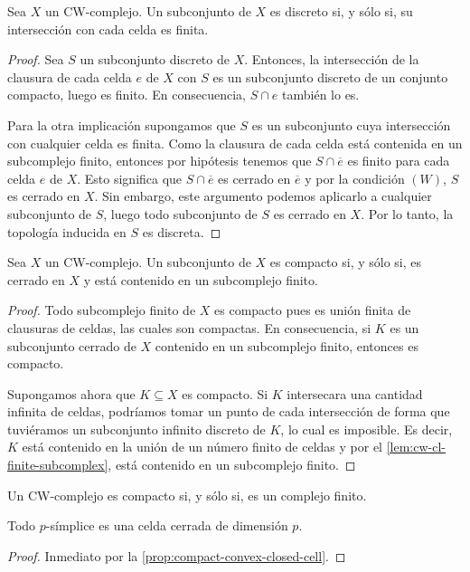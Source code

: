 \begin{lema}
	Sea \(X\) un CW-complejo. Un subconjunto de \(X\) es discreto si, y sólo si, su intersección con cada 
	celda es finita.
\end{lema}
\begin{proof}
	Sea \(S\) un subconjunto discreto de \(X\). Entonces, la intersección de la clausura de cada 
	celda \(e\) de \(X\) con \(S\) es un subconjunto discreto de un conjunto compacto, luego es finito. 
	En consecuencia, \(S \cap e\) también lo es.
	
	Para la otra implicación supongamos que \(S\) es un subconjunto cuya intersección con 
	cualquier celda es finita. Como la clausura de cada celda está contenida en un 
	subcomplejo finito, entonces por hipótesis tenemos que \(S \cap \overline{e}\) es finito 
	para cada celda \(e\) de \(X\). Esto significa que \(S \cap \overline{e}\) es cerrado en 
	\(\overline{e}\) y por la condición \((W)\), \(S\) es cerrado en \(X\). Sin embargo, este argumento 
	podemos aplicarlo a cualquier subconjunto de \(S\), luego todo subconjunto de \(S\) es cerrado en 
	\(X\). Por lo tanto, la topología inducida en \(S\) es discreta. 
\end{proof}

\begin{teorema}
	Sea \(X\) un CW-complejo. Un subconjunto de \(X\) es compacto si, y sólo si, es cerrado en \(X\) 
	y está contenido en un subcomplejo finito.
\end{teorema}
\begin{proof}
	Todo subcomplejo finito de \(X\) es compacto pues es unión finita de clausuras de celdas, las 
	cuales son compactas. En consecuencia, si \(K\) es un subconjunto cerrado de \(X\) contenido 
	en un subcomplejo finito, entonces es compacto.
	
	Supongamos ahora que \(K \subseteq X\) es compacto. Si \(K\) intersecara una cantidad infinita 
	de celdas, podríamos tomar un punto de cada intersección de forma que tuviéramos un 
	subconjunto infinito discreto de \(K\), lo cual es imposible. Es decir, \(K\) está contenido 
	en la unión de un número finito de celdas y por el \autoref{lem:cw-cl-finite-subcomplex}, 
	está contenido en un subcomplejo finito.
\end{proof}

\begin{corolario}
	Un CW-complejo es compacto si, y sólo si, es un complejo finito.
\end{corolario}

\begin{proposicion}
	Todo $p$-símplice es una celda cerrada de dimensión $p$.
\end{proposicion}
\begin{proof}
	Inmediato por la \autoref{prop:compact-convex-closed-cell}.
\end{proof}

